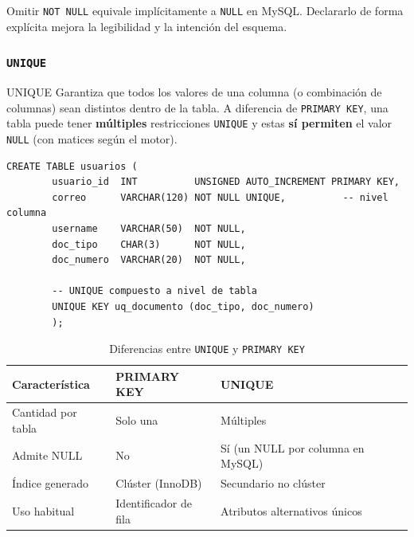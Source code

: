 \documentclass[12pt, a4paper]{article}
\begin{document}
	\begin{nota}
		Omitir \texttt{NOT NULL} equivale implícitamente a \texttt{NULL} en MySQL.
		Declararlo de forma explícita mejora la legibilidad y la intención del
		esquema.
	\end{nota}
	
	\subsubsection{\texttt{UNIQUE}}
	
	\begin{definicion}{UNIQUE}
		Garantiza que todos los valores de una columna (o combinación de columnas)
		sean distintos dentro de la tabla. A diferencia de \texttt{PRIMARY KEY},
		una tabla puede tener \textbf{múltiples} restricciones \texttt{UNIQUE} y
		estas \textbf{sí permiten} el valor \texttt{NULL} (con matices según el
		motor).
	\end{definicion}
	
	\begin{lstlisting}[style=sql, caption={UNIQUE a nivel de columna y de tabla}]
		CREATE TABLE usuarios (
		usuario_id  INT          UNSIGNED AUTO_INCREMENT PRIMARY KEY,
		correo      VARCHAR(120) NOT NULL UNIQUE,          -- nivel columna
		username    VARCHAR(50)  NOT NULL,
		doc_tipo    CHAR(3)      NOT NULL,
		doc_numero  VARCHAR(20)  NOT NULL,
		
		-- UNIQUE compuesto a nivel de tabla
		UNIQUE KEY uq_documento (doc_tipo, doc_numero)
		);
	\end{lstlisting}
	
	\begin{table}[H]
		\centering
		\caption{Diferencias entre \texttt{UNIQUE} y \texttt{PRIMARY KEY}}
		\renewcommand{\arraystretch}{1.3}
		\begin{tabularx}{\textwidth}{l X X}
			\toprule
			\textbf{Característica} & \textbf{PRIMARY KEY}          & \textbf{UNIQUE}                      \\
			\midrule
			Cantidad por tabla      & Solo una                      & Múltiples                            \\
			Admite NULL             & No                            & Sí (un NULL por columna en MySQL)    \\
			Índice generado         & Clúster (InnoDB)              & Secundario no clúster                \\
			Uso habitual            & Identificador de fila         & Atributos alternativos únicos        \\
			\bottomrule
		\end{tabularx}
	\end{table}
	
\end{document}
